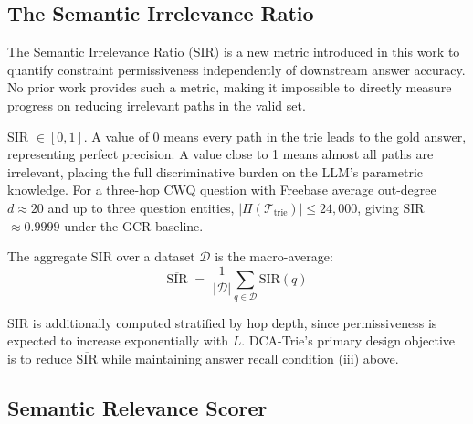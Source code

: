 \subsection{The Semantic Irrelevance Ratio}
\label{sec:oracle:sir}

The Semantic Irrelevance Ratio (SIR) is a new metric introduced in this work to quantify constraint permissiveness independently of downstream answer accuracy. No prior work provides such a metric, making it impossible to directly measure progress on reducing irrelevant paths in the valid set.


SIR $\in [0, 1]$. A value of 0 means every path in the trie leads to the gold answer, representing perfect precision. A value close to 1 means almost all paths are irrelevant, placing the full discriminative burden on the LLM's parametric knowledge. For a three-hop CWQ question with Freebase average out-degree $d \approx 20$ and up to three question entities, $|\Pi(\mathcal{T}_{\text{trie}})| \leq 24{,}000$, giving SIR $\approx 0.9999$ under the GCR baseline.

The aggregate SIR over a dataset $\mathcal{D}$ is the macro-average:
\[
    \overline{\text{SIR}} \;=\; \frac{1}{|\mathcal{D}|} \sum_{q \in \mathcal{D}} \text{SIR}(q)
\]

SIR is additionally computed stratified by hop depth, since permissiveness is expected to increase exponentially with $L$. DCA-Trie's primary design objective is to reduce $\overline{\text{SIR}}$ while maintaining answer recall condition (iii) above.

\subsection{Semantic Relevance Scorer}
\label{sec:oracle:scorer}

